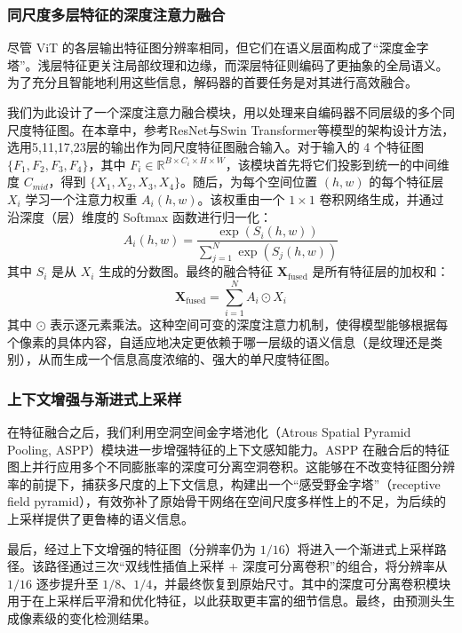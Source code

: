 \subsubsection{同尺度多层特征的深度注意力融合}
尽管 ViT 的各层输出特征图分辨率相同，但它们在语义层面构成了“深度金字塔”。浅层特征更关注局部纹理和边缘，而深层特征则编码了更抽象的全局语义。为了充分且智能地利用这些信息，解码器的首要任务是对其进行高效融合。

我们为此设计了一个深度注意力融合模块，用以处理来自编码器不同层级的多个同尺度特征图。在本章中，参考ResNet与Swin Transformer等模型的架构设计方法，选用5,11,17,23层的输出作为同尺度特征图融合输入。对于输入的 4 个特征图 $\{F_1, F_2, F_3, F_4\}$，其中 $F_i \in \mathbb{R}^{B \times C_i \times H \times W}$，该模块首先将它们投影到统一的中间维度 $C_{mid}$，得到 $\{X_1, X_2, X_3, X_4\}$。随后，为每个空间位置 $(h, w)$ 的每个特征层 $X_i$ 学习一个注意力权重 $A_i(h, w)$。该权重由一个 $1 \times 1$ 卷积网络生成，并通过沿深度（层）维度的 Softmax 函数进行归一化：
\begin{equation}
    A_i(h, w) = \frac{\exp(S_i(h, w))}{\sum_{j=1}^{N} \exp(S_j(h, w))}
\end{equation}
其中 $S_i$ 是从 $X_i$ 生成的分数图。最终的融合特征 $\mathbf{X}_{\text{fused}}$ 是所有特征层的加权和：
\begin{equation}
    \mathbf{X}_{\text{fused}} = \sum_{i=1}^{N} A_i \odot X_i
\end{equation}
其中 $\odot$ 表示逐元素乘法。这种空间可变的深度注意力机制，使得模型能够根据每个像素的具体内容，自适应地决定更依赖于哪一层级的语义信息（是纹理还是类别），从而生成一个信息高度浓缩的、强大的单尺度特征图。

\subsubsection{上下文增强与渐进式上采样}
在特征融合之后，我们利用空洞空间金字塔池化（Atrous Spatial Pyramid Pooling, ASPP）模块进一步增强特征的上下文感知能力。ASPP 在融合后的特征图上并行应用多个不同膨胀率的深度可分离空洞卷积。这能够在不改变特征图分辨率的前提下，捕获多尺度的上下文信息，构建出一个“感受野金字塔”（receptive field pyramid），有效弥补了原始骨干网络在空间尺度多样性上的不足，为后续的上采样提供了更鲁棒的语义信息。

最后，经过上下文增强的特征图（分辨率仍为 $1/16$）将进入一个渐进式上采样路径。该路径通过三次“双线性插值上采样 + 深度可分离卷积”的组合，将分辨率从 $1/16$ 逐步提升至 $1/8$、$1/4$，并最终恢复到原始尺寸。其中的深度可分离卷积模块用于在上采样后平滑和优化特征，以此获取更丰富的细节信息。最终，由预测头生成像素级的变化检测结果。

